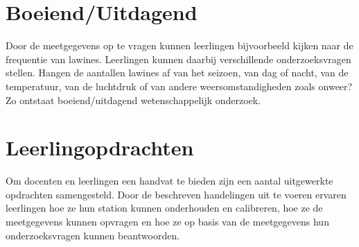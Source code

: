 \section{Boeiend/Uitdagend}

Door de meetgegevens op te vragen kunnen leerlingen bijvoorbeeld kijken
naar de frequentie van lawines.  Leerlingen kunnen daarbij verschillende
onderzoeksvragen stellen. Hangen de aantallen lawines af van het
seizoen, van dag of nacht, van de temperatuur, van de luchtdruk of van
andere weersomstandigheden zoals onweer? Zo ontstaat boeiend/uitdagend
wetenschappelijk onderzoek. 


\section{Leerlingopdrachten}

Om docenten en leerlingen een handvat te bieden zijn een aantal
uitgewerkte opdrachten samengesteld. Door de beschreven handelingen uit
te voeren ervaren leerlingen hoe ze hun \hisparc station kunnen
onderhouden en calibreren, hoe ze de meetgegevens kunnen opvragen en hoe
ze op basis van de meetgegevens hun onderzoeksvragen kunnen beantwoorden.


